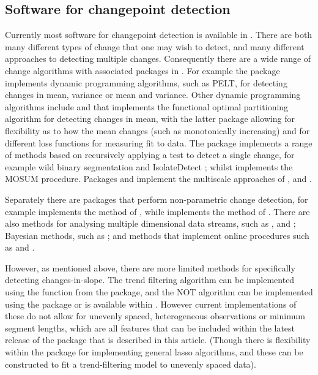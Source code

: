 \documentclass[article]{jss}
\begin{document}
\subsection{Software for changepoint detection}

Currently most software for changepoint detection is available in  \cite[the main exception being the   package of][which has similar functionality to the  described below]{truong2018ruptures}.
There are both many different types of change that one may wish to detect, and many different approaches to detecting multiple changes. Consequently there are a wide range of change algorithms with associated packages in . For example the  package \citep{killick2014changepoint} implements dynamic programming algorithms, such as PELT, for detecting changes in mean, variance or mean and variance. Other dynamic programming algorithms include  and  \citep{runge2020gfpop} that implements the functional optimal partitioning algorithm \citep{maidstone2017optimal} for detecting changes in mean, with the latter package allowing for flexibility as to how the mean changes (such as monotonically increasing) and for different loss functions for measuring fit to data. The  package implements a range of methods based on recursively applying a test to detect a single change, for example wild binary segmentation \citep{fryzlewicz2014wild} and IsolateDetect \citep{anastasiou2022detecting}; whilst  \citep{meier2021mosum} implements the MOSUM procedure. Packages  \cite[]{stepR} and  implement the multiscale approaches of \cite{frick2014multiscale}, \cite{pein2017heterogeneous} and \cite{li2016fdr}.

Separately there are packages that perform non-parametric change detection, for example  \citep{james2015ecp} implements the method of \cite{matteson2014nonparametric}, while   implements the method of \cite{haynes2017NP}. There are also methods for analysing multiple dimensional data streams, such as  \citep{wang2018high}, %
and  \citep{grundy2020high}; Bayesian methods, such as  \citep{erdman2008bcp}; and methods that implement online procedures such as  \citep{ross2015parametric} and  \citep{romano2021fast}.

However, as mentioned above, there are more limited methods for specifically detecting changes-in-slope.  The trend filtering algorithm can be implemented using the  function from the  \citep{genlasso} package, and the NOT algorithm can be implemented using the  package or is available within . However current implementations of these do not allow for unevenly spaced, heterogeneous observations or minimum segment lengths, which are all features that can be included within the latest release of the  package that is described in this article. (Though there is flexibility within the  package for implementing general lasso algorithms, and these can be constructed to fit a trend-filtering model to unevenly spaced data). 
\end{document}
